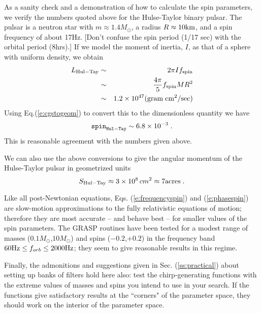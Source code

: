 As a sanity check and a demonstration of how to calculate
the spin parameters, we verify the numbers quoted above for the
Hulse-Taylor binary pulsar.  The pulsar is a neutron star
with $m \approx 1.4M_\odot$,  a radius $R \approx 10{\rm km}$, and a
spin frequency of about 17Hz.  [Don't confuse the spin
period (1/17 sec) with the orbital period (8hrs).]
If we model the moment of inertia, $I$, as that of  a sphere
with uniform density, we obtain
\begin{eqnarray}
L_{\rm Hul-Tay} &\sim& 2 \pi I f_{\rm spin}   \nonumber \\
                &\sim& {4 \pi  \over 5}   f_{\rm spin} M R^2 \nonumber  \\
                &\sim& 1.2  \times 10^{47}  ({\rm gram\;cm^2/sec}) \nonumber 
\end{eqnarray}
Using Eq.(\ref{e:cgstogeom}) to convert this to the
dimensionless quantity we have
\begin{equation}
\label{spinhultay}
{\tt spin}_{\tt Hul-Tay} \sim 6.8 \times 10^{-3}  \; .
\end{equation}
This is reasonable agreement with the numbers given above.

We can also use the above conversions to give the 
angular momentum of the Hulse-Taylor pulsar in
geometrized units 
\begin{equation}
S_{\rm Hul-Tay} \approx 3\times10^8 \, cm^2 \approx 7 {\rm acres} \; .
\end{equation}

Like all post-Newtonian equations, Eqs. (\ref{e:frequencyspin})
and (\ref{e:phasespin}) are slow-motion approximations
to the fully relativistic equations of motion;
therefore they are most accurate 
-- and behave best --
for smaller values of the spin parameters.
The GRASP routines have been tested for a modest
range of masses ($0.1M_\odot$,$10M_\odot$)
and spins ($-0.2$,$+0.2$) in the frequency
band $60{\rm Hz} \leq f_{orb} \leq 2000{\rm Hz}$; they seem to give
reasonable results in this regime.

Finally, the admonitions and suggestions given in
Sec. (\ref{ss:practical}) about setting up banks
of filters hold here also: test the chirp-generating
functions with the extreme values of masses and
spins you intend to use in your search.
If the functions give satisfactory results
at the ``corners" of the parameter space,
they should work on the interior of the parameter space.
\clearpage

